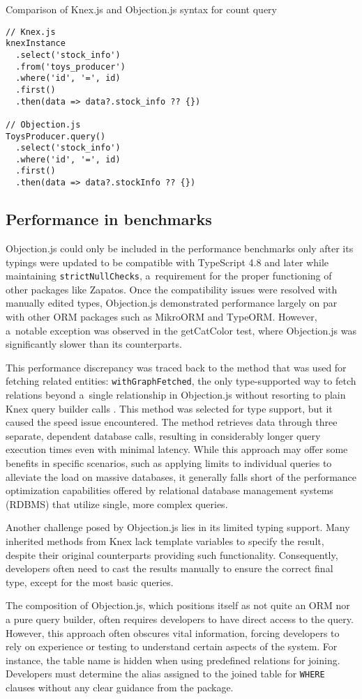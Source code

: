 \begin{listing}
\caption{Comparison of Knex.js and Objection.js syntax for count query}
\label{lst:knexObjection}
\begin{verbatim}
// Knex.js
knexInstance
  .select('stock_info')
  .from('toys_producer')
  .where('id', '=', id)
  .first()
  .then(data => data?.stock_info ?? {})

// Objection.js
ToysProducer.query()
  .select('stock_info')
  .where('id', '=', id)
  .first()
  .then(data => data?.stockInfo ?? {})
\end{verbatim}
\end{listing}

\subsection*{Performance in benchmarks}

Objection.js could only be included in the performance benchmarks only after its
typings were updated to be compatible with TypeScript 4.8 and later while
maintaining \texttt{strictNullChecks}, a~requirement for the proper functioning
of other packages like Zapatos. Once the compatibility issues were resolved with
manually edited types, Objection.js demonstrated performance largely on par with
other ORM packages such as MikroORM and TypeORM. However, a~notable exception
was observed in the getCatColor test, where Objection.js was significantly
slower than its counterparts.

This performance discrepancy was traced back to the method that was used for
fetching related entities: \texttt{withGraphFetched}, the only type-supported
way to fetch relations beyond a~single relationship in Objection.js without
resorting to plain Knex query builder calls \cite{objectionDocs}. This method
was selected for type support, but it caused the speed issue encountered. The
method retrieves data through three separate, dependent database calls,
resulting in considerably longer query execution times even with minimal
latency. While this approach may offer some benefits in specific scenarios, such
as applying limits to individual queries to alleviate the load on massive
databases, it generally falls short of the performance optimization capabilities
offered by relational database management systems (RDBMS) that utilize single,
more complex queries.

Another challenge posed by Objection.js lies in its limited typing support. Many
inherited methods from Knex lack template variables to specify the result,
despite their original counterparts providing such functionality. Consequently,
developers often need to cast the results manually to ensure the correct final
type, except for the most basic queries.

The composition of Objection.js, which positions itself as not quite an ORM nor
a pure query builder, often requires developers to have direct access to the
query. However, this approach often obscures vital information, forcing
developers to rely on experience or testing to understand certain aspects of the
system. For instance, the table name is hidden when using predefined relations
for joining. Developers must determine the alias assigned to the joined table
for \texttt{WHERE} clauses without any clear guidance from the package.